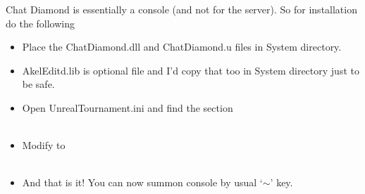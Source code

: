 \documentclass{article}
\theoremstyle{definition}
\newcommand{\FileColor}[1]{{\color{Purple} #1}}
\newcommand{\FolderColor}[1]{{\color{mygray} #1}}
\begin{document}
Chat Diamond is essentially a console (and not for the server).  So for installation do the following
\begin{itemize}
\item Place the \FileColor{ChatDiamond.dll} and \FileColor{ChatDiamond.u} files in \FolderColor{System} directory.
\item \FileColor{AkelEditd.lib} is optional file and I'd copy that too in \FolderColor{System} directory just to be safe.
\item Open \FileColor{UnrealTournament.ini} and find the section \\

\\

\item Modify to \\

\\

\item And that is it!  You can now summon console by usual `$\sim$' key.


\end{itemize}
\end{document}
